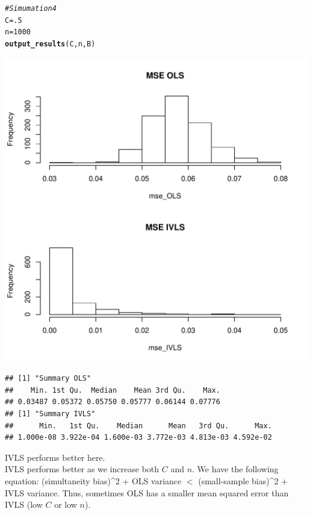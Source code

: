 \documentclass[11pt]{article}\usepackage[]{graphicx}\usepackage[]{color}
\makeatletter
\def\maxwidth{ %
  \ifdim\Gin@nat@width>\linewidth
    \linewidth
  \else
    \Gin@nat@width
  \fi
}
\newcommand{\hlnum}[1]{\textcolor[rgb]{0.686,0.059,0.569}{#1}}%
\newcommand{\hlcom}[1]{\textcolor[rgb]{0.678,0.584,0.686}{\textit{#1}}}%
\newcommand{\hlstd}[1]{\textcolor[rgb]{0.345,0.345,0.345}{#1}}%
\newcommand{\hlkwb}[1]{\textcolor[rgb]{0.69,0.353,0.396}{#1}}%
\newcommand{\hlkwd}[1]{\textcolor[rgb]{0.737,0.353,0.396}{\textbf{#1}}}%
\newenvironment{kframe}{%
 \def\at@end@of@kframe{}%
 \ifinner\ifhmode%
  \def\at@end@of@kframe{\end{minipage}}%
  \begin{minipage}{\columnwidth}%
 \fi\fi%
 \def\FrameCommand##1{\hskip\@totalleftmargin \hskip-\fboxsep
 \colorbox{shadecolor}{##1}\hskip-\fboxsep
     \hskip-\linewidth \hskip-\@totalleftmargin \hskip\columnwidth}%
 \MakeFramed {\advance\hsize-\width
   \@totalleftmargin\z@ \linewidth\hsize
   \@setminipage}}%
 {\par\unskip\endMakeFramed%
 \at@end@of@kframe}
\newenvironment{knitrout}{}{} %
\makeatother
\begin{document}
\begin{knitrout}
\color{fgcolor}\begin{kframe}
\begin{alltt}
\hlcom{# Simumation 4}
\hlstd{C}\hlkwb{=}\hlnum{.5}
\hlstd{n}\hlkwb{=}\hlnum{1000}
\hlkwd{output_results}\hlstd{(C,n,B)}
\end{alltt}
\end{kframe}
\includegraphics[width=\maxwidth]{figure/unnamed-chunk-7-1} 
\begin{kframe}\begin{lstlisting}[basicstyle=\ttfamily,breaklines=true]
## [1] "Summary OLS"
##    Min. 1st Qu.  Median    Mean 3rd Qu.    Max. 
## 0.03487 0.05372 0.05750 0.05777 0.06144 0.07776 
## [1] "Summary IVLS"
##      Min.   1st Qu.    Median      Mean   3rd Qu.      Max. 
## 1.000e-08 3.922e-04 1.600e-03 3.772e-03 4.813e-03 4.592e-02
\end{lstlisting}
\end{kframe}
\end{knitrout}
IVLS performs better here.
\\
IVLS performs better as we increase both $C$ and $n$. We have the following equation: (simultaneity bias)^2 + OLS variance $<$ (small-sample bias)^2 + IVLS variance. Thus, sometimes OLS has a smaller mean squared error than IVLS (low $C$ or low $n$).
\end{document}
